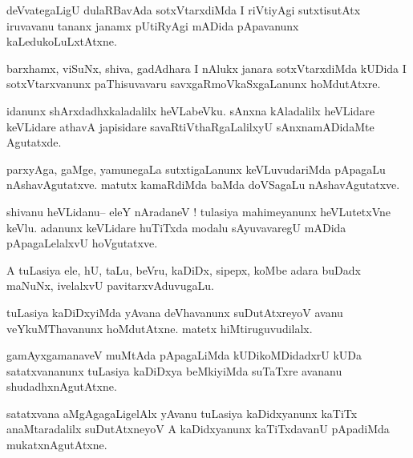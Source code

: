 \documentclass{article}
\begin{document}
\begin{mn}%
deVvategaLigU dulaRBavAda sotxVtarxdiMda I riVtiyAgi sutxtisutAtx iruvavanu tananx janamx 
pUtiRyAgi mADida pApavanunx kaLedukoLuLxtAtxne.
\end{mn}

\begin{mn}%
barxhamx, viSuNx, shiva, gadAdhara I nAlukx janara sotxVtarxdiMda kUDida I sotxVtarxvanunx 
paThisuvavaru savxgaRmoVkaSxgaLanunx hoMdutAtxre.
\end{mn}

\begin{mn}%
idanunx shArxdadhxkaladalilx heVLabeVku. sAnxna kAladalilx heVLidare keVLidare athavA 
japisidare savaRtiVthaRgaLalilxyU sAnxnamADidaMte Agutatxde.
\end{mn}

\begin{mn}%
parxyAga, gaMge, yamunegaLa sutxtigaLanunx keVLuvudariMda pApagaLu nAshavAgutatxve. matutx 
kamaRdiMda baMda doVSagaLu nAshavAgutatxve.
\end{mn}


\begin{mn}%
shivanu heVLidanu-- eleY nAradaneV ! tulasiya mahimeyanunx heVLutetxVne keVlu. adanunx 
keVLidare huTiTxda modalu sAyuvavaregU mADida pApagaLelalxvU hoVgutatxve.
\end{mn}

\begin{mn}%
A tuLasiya ele, hU, taLu, beVru, kaDiDx, sipepx, koMbe adara buDadx maNuNx, ivelalxvU 
pavitarxvAduvugaLu.
\end{mn}

\begin{mn}%
tuLasiya kaDiDxyiMda yAvana deVhavanunx suDutAtxreyoV avanu veYkuMThavanunx hoMdutAtxne. 
matetx hiMtiruguvudilalx. 
\end{mn}

\begin{mn}%
gamAyxgamanaveV muMtAda pApagaLiMda kUDikoMDidadxrU kUDa satatxvananunx tuLasiya kaDiDxya 
beMkiyiMda suTaTxre avananu shudadhxnAgutAtxne.
\end{mn}

\begin{mn}%
satatxvana aMgAgagaLigelAlx yAvanu tuLasiya kaDidxyanunx kaTiTx anaMtaradalilx suDutAtxneyoV 
A kaDidxyanunx kaTiTxdavanU pApadiMda mukatxnAgutAtxne.
\end{mn}
\end{document}
